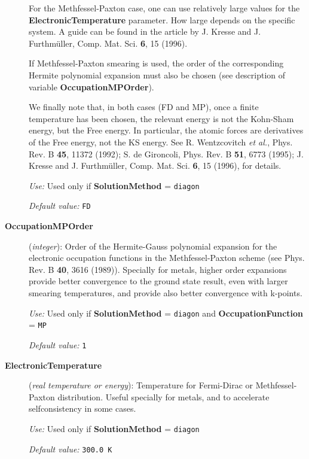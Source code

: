 \documentclass[11pt]{article}
\begin{document}
\begin{description}
For the Methfessel-Paxton case, one can use relatively large
values for the {\bf ElectronicTemperature} parameter. How large
depends on the specific system. A guide can be found in the
article by J. Kresse and J. Furthm\"uller, Comp. Mat. Sci.
{\bf 6}, 15 (1996).

If Methfessel-Paxton smearing is used, the order of
the corresponding Hermite polynomial expansion must also be chosen
(see description of variable {\bf OccupationMPOrder}).

We finally note that, in both cases (FD and MP), once a finite
temperature has been chosen, the relevant energy is not the Kohn-Sham
energy, but the Free energy. In particular, the
atomic forces are derivatives of the Free energy, not the KS 
energy. See R. Wentzcovitch {\it et al.}, Phys. Rev. B {\bf 45},
11372 (1992); S. de Gironcoli, Phys. Rev. B {\bf 51}, 6773 (1995);
J. Kresse and J. Furthm\"uller, Comp. Mat. Sci.
{\bf 6}, 15 (1996),
for details.


{\it Use:} Used only if {\bf SolutionMethod} = {\tt diagon}

{\it Default value:} {\tt FD} 

\item[{\bf OccupationMPOrder}]({\it integer}):
Order of the Hermite-Gauss polynomial expansion for the
electronic occupation functions in the Methfessel-Paxton
scheme (see Phys. Rev. B  {\bf 40}, 3616 (1989)).
Specially for metals, higher order expansions provide better convergence
to the ground state result, even with larger smearing
temperatures, and provide also better convergence with k-points.


{\it Use:} Used only if {\bf SolutionMethod} = {\tt diagon}
and {\bf OccupationFunction} =  {\tt MP}

{\it Default value:} {\tt 1} 



\item[{\bf ElectronicTemperature}] ({\it real temperature or energy}): 
Temperature for Fermi-Dirac or Methfessel-Paxton
distribution. Useful specially for
metals, and to accelerate selfconsistency in some cases.

{\it Use:} Used only if {\bf SolutionMethod} = {\tt diagon}

{\it Default value:} {\tt 300.0 K}



\end{description}
\end{document}
